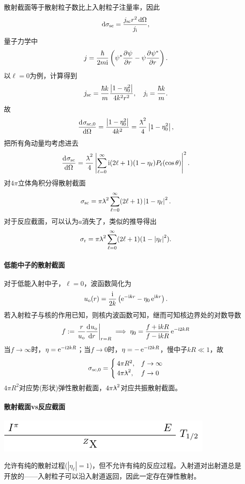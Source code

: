 散射截面等于散射粒子数比上入射粒子注量率，因此
\[
	\mathop{}\!\mathrm{d}\sigma_{\mathrm{sc}}=\frac{j_{\mathrm{sc}} r^2\mathop{}\!\mathrm{d}\Omega}{j_{\mathrm{i}}},
\]
量子力学中
\[
	j=\frac{\hbar}{2m\mathrm{i}}\left(\psi^\ast\frac{\partial^{{}}\psi}{\partial{r}^{{}}}-\psi\frac{\partial^{{}}\psi^\ast}{\partial{r}^{{}}}\right).
\]
以$\ell=0$为例，计算得到
\[
	j_{\mathrm{sc}}=\frac{\hbar k}m\frac{\left\lvert1-\eta_0^2\right\rvert}{4k^2r^2},\quad j_{\mathrm{i}}=\frac{\hbar k}m.
\]
故
\[
	\frac{\mathrm{d}^{{}}\sigma_{\mathrm{sc},0}}{\mathrm{d}{\Omega}^{{}}}=\frac{\left\lvert1-\eta_0^2\right\rvert}{4k^2}=\frac{{^-\!\!\!\!\lambda}^2}4\left\lvert1-\eta_0^2\right\rvert,
\]
把所有角动量均考虑进去
\[
	\frac{\mathrm{d}^{{}}\sigma_{\mathrm{sc}}}{\mathrm{d}{\Omega}^{{}}}=\frac{{^-\!\!\!\!\lambda}^2}4\left\lvert\sum_{\ell=0}^\infty\mathrm{i}(2\ell+1)(1-\eta_\ell)P_\ell(\cos\theta)\right\rvert^2.
\]
对$4\pi$立体角积分得散射截面
\begin{align}
	\sigma_{\mathrm{sc}}=\pi{^{_-}\!\!\!\!\lambda}^2\sum_{\ell=0}^\infty(2\ell+1)\left\lvert1-\eta_\ell\right\rvert^2.
\end{align}
对于反应截面，可以认为$a$消失了，类似的推导得出
\[
	\sigma_{\mathrm{r}}=\pi{^{_-}\!\!\!\!\lambda}^2\sum_{\ell=0}^\infty(2\ell+1)(1-\left\lvert\eta_\ell\right\rvert^2).
\]

\paragraph{低能中子的散射截面}对于低能入射中子，$\ell=0$，波函数简化为 
\[
	u_{\mathrm o}(r)=\frac{\mathrm{i}}{2k}\left(\mathop{}\!\mathrm{e}^{-\mathrm{i} kr}-\eta_0\mathop{}\!\mathrm{e}^{\mathrm{i} kr}\right).
\]
若入射粒子与核的作用已知，则核内波函数可知，继而可知核边界处的对数导数
\[
	f:=\left.\frac r{u_{\mathrm o}}\frac{\mathrm{d}^{{}}u_{\mathrm o}}{\mathrm{d}{r}^{{}}}\right\rvert_{r=R}\implies\eta_0=\frac{f+\mathrm{i} kR}{f-\mathrm{i} kR}\mathop{}\!\mathrm{e}^{-\mathrm{i}2kR}
\]
当$f\to\infty$时，$\eta=\mathop{}\!\mathrm{e}^{-\mathrm{i}2kR}$；当$f\to0$时，$\eta=-\mathop{}\!\mathrm{e}^{-\mathrm{i}2kR}$，慢中子$kR\ll 1$，故 
\begin{align}
	\sigma_{\mathrm{sc},0}=\begin{cases}
		4\pi R^2,&f\to\infty\\
		4\pi{^{_-}\!\!\!\!\lambda}^2,&f\to0
	\end{cases}
\end{align}
$4\pi R^2$对应势(形状)弹性散射截面，$4\pi{^{_-}\!\!\!\!\lambda}^2$对应共振散射截面。
\paragraph{散射截面vs反应截面}
\begin{center}
	\includegraphics[page=12]{figures/tikz/layouts.pdf}
\end{center}
允许有纯的散射过程($|\eta_\ell|=1$)，但不允许有纯的反应过程。入射道对出射道总是开放的——入射粒子可以沿入射道返回，因此一定存在弹性散射。

